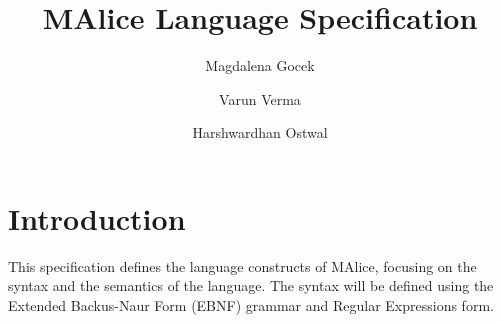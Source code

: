 \documentclass[a4wide, 11pt]{article}
\begin{document}
\title{MAlice Language Specification}

\author{Magdalena Gocek \and Varun Verma \and Harshwardhan Ostwal}

\maketitle            %

\section{Introduction}
\label{sec:intro}
This specification defines the language constructs of MAlice, focusing on  
the syntax and the semantics of the language. The syntax will be defined
using the Extended Backus-Naur Form (EBNF) grammar and Regular Expressions form.


\end{document}
